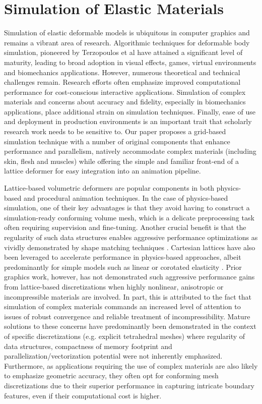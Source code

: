 \documentclass[12pt,oneside,letterpaper]{memoir}
\begin{document}
\section{Simulation of Elastic Materials}

Simulation of elastic deformable models is ubiquitous in computer
graphics and remains a vibrant area of research. Algorithmic
techniques for deformable body simulation, pioneered by Terzopoulos et
al  have attained a significant level of
maturity, leading to broad adoption in visual effects, games, virtual
environments and biomechanics applications. However, numerous
theoretical and technical challenges remain. Research efforts often
emphasize improved computational performance for cost-conscious
interactive applications. Simulation of complex materials and concerns
about accuracy and fidelity, especially in biomechanics applications,
place additional strain on simulation techniques. Finally, ease of use
and deployment in production environments is an important trait that
scholarly research work needs to be sensitive to. Our paper proposes a
grid-based simulation technique with a number of original components
that enhance performance and parallelism, natively accommodate complex
materials (including skin, flesh and muscles) while offering the
simple and familiar front-end of a lattice deformer for easy
integration into an animation pipeline.

Lattice-based volumetric deformers are popular components in both
physics-based and procedural animation techniques. In the case of
physics-based simulation, one of their key advantages is that they
avoid having to construct a simulation-ready conforming volume mesh,
which is a delicate preprocessing task often requiring supervision and
fine-tuning. Another crucial benefit is that the regularity of such
data structures enables aggressive performance optimizations as
vividly demonstrated by shape matching techniques
\cite{RiverJ:2007}. Cartesian lattices have also been leveraged to
accelerate performance in physics-based approaches, albeit
predominantly for simple models such as linear or corotated elasticity
\cite{MuellTG:2004,GeorgW:2008,McAdaZSETTS:2011}. Prior graphics work,
however, has not demonstrated such aggressive performance gains from
lattice-based discretizations when highly nonlinear, anisotropic or
incompressible materials are involved. In part, this is attributed to
the fact that simulation of complex materials commands an increased
level of attention to issues of robust convergence and reliable
treatment of incompressibility. Mature solutions to these concerns
have predominantly been demonstrated in the context of specific
discretizations (e.g. explicit tetrahedral meshes) where regularity of
data structures, compactness of memory footprint and
parallelization/vectorization potential were not inherently
emphasized. Furthermore, as applications requiring the use of complex
materials are also likely to emphasize geometric accuracy, they often
opt for conforming mesh discretizations due to their superior
performance in capturing intricate boundary features, even if their
computational cost is higher.
\end{document}
